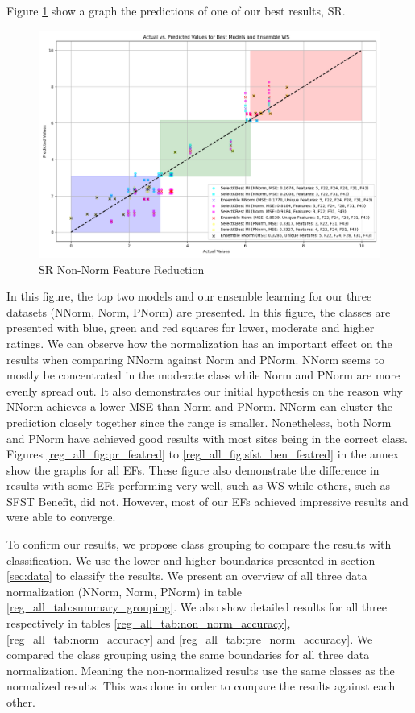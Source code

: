 \documentclass[12pt,letterpaper]{article}
\begin{document}
Figure \ref{reg_all_fig:ws_featred_big} show a graph the predictions of one of our best results, \ac{SR}.

\begin{figure}
    \centering
    \includegraphics[width=1\linewidth]{reg_section_all/featred_ensemble_learning/actual_vs_predicted_best_feature_selection_and_ensemble_WS_10.png}
    \caption{SR Non-Norm Feature Reduction}
    \label{reg_all_fig:ws_featred_big}
\end{figure}

In this figure, the top two models and our ensemble learning for our three datasets (NNorm, Norm, PNorm) are presented.
In this figure, the classes are presented with blue, green and red squares for lower, moderate and higher ratings.
We can observe how the normalization has an important effect on the results when comparing NNorm against Norm and PNorm.
NNorm seems to mostly be concentrated in the moderate class while Norm and PNorm are more evenly spread out.
It also demonstrates our initial hypothesis on the reason why NNorm achieves a lower MSE than Norm and PNorm.
NNorm can cluster the prediction closely together since the range is smaller.
Nonetheless, both Norm and PNorm have achieved good results with most sites being in the correct class.
Figures \ref{reg_all_fig:pr_featred} to \ref{reg_all_fig:sfst_ben_featred} in the annex show the graphs for all \ac{EF}s.
These figure also demonstrate the difference in results with some \ac{EF}s performing very well, such as \ac{WS} while others, such as \ac{SFST} Benefit, did not.
However, most of our \ac{EF}s achieved impressive results and were able to converge.

To confirm our results, we propose class grouping to compare the results with classification.
We use the lower and higher boundaries presented in section \ref{sec:data} to classify the results.
We present an overview of all three data normalization (NNorm, Norm, PNorm) in table \ref{reg_all_tab:summary_grouping}.
We also show detailed results for all three respectively in tables \ref{reg_all_tab:non_norm_accuracy}, \ref{reg_all_tab:norm_accuracy} and \ref{reg_all_tab:pre_norm_accuracy}.
We compared the class grouping using the same boundaries for all three data normalization.
Meaning the non-normalized results use the same classes as the normalized results.
This was done in order to compare the results against each other.
\end{document}
